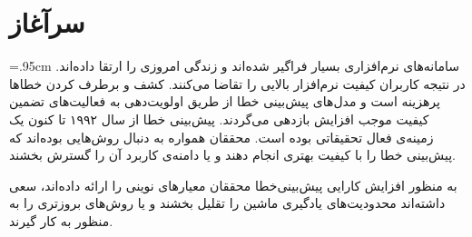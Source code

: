 	
\chapter{سرآغاز}
\baselineskip=.95cm
سامانه‌های نرم‌افزاری بسیار فراگیر شده‌اند و زندگی امروزی را ارتقا داده‌اند. در نتیجه کاربران کیفیت نرم‌افزار بالایی را تقاضا می‌کنند. کشف و برطرف کردن خطاها پرهزینه است و مدل‌های پیش‌بینی خطا  از طریق اولویت‌دهی به فعالیت‌های تضمین کیفیت موجب افزایش بازدهی می‌گردند. پیش‌بینی خطا از سال ۱۹۹۲ تا کنون یک زمینه‌ی فعال تحقیقاتی بوده است. محققان همواره به دنبال روش‌هایی بوده‌اند که پیش‌بینی خطا را با کیفیت بهتری انجام دهند و یا دامنه‌ی کاربرد آن را گسترش بخشند. 

به  منظور افزایش کارایی پیش‌بینی‌خطا محققان معیارهای نوینی را ارائه داده‌اند\cite{bacchelli2010popular}، سعی داشته‌اند محدودیت‌های یادگیری ماشین را تقلیل بخشند\cite{limsettho2018cross} و یا روش‌های بروزتری را به منظور  به کار گیرند\cite{chen2016software}. 

